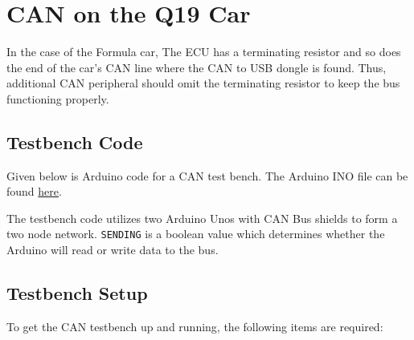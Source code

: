 \documentclass[letterpaper]{article}
\begin{document}
\section{CAN on the Q19 Car}
In the case of the Formula car, The ECU has a terminating resistor and so does
the end of the car's CAN line where the CAN to USB dongle is found. Thus,
additional CAN peripheral should omit the terminating resistor to keep the bus
functioning properly.

\subsection{Testbench Code}
Given below is Arduino code for a CAN test bench. The Arduino INO file can be
found
\href{https://github.com/bchampp/Q20/blob/master/CAN/testbench/testbench.ino}{here}.



\lstset{basicstyle=\ttfamily}

The testbench code utilizes two Arduino Unos with CAN Bus shields to form a
two node network. \lstinline{SENDING} is a boolean value which determines whether the
Arduino will read or write data to the bus.

\subsection{Testbench Setup}
To get the CAN testbench up and running, the following items are required:
\end{document}
